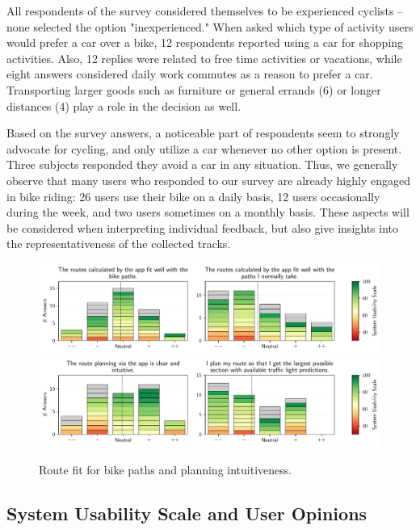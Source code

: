All respondents of the survey considered themselves to be experienced cyclists -- none selected the option "inexperienced." When asked which type of activity users would prefer a car over a bike, 12 respondents reported using a car for shopping activities. Also, 12 replies were related to free time activities or vacations, while eight answers considered daily work commutes as a reason to prefer a car. Transporting larger goods such as furniture or general errands (6) or longer distances (4) play a role in the decision as well. 

Based on the survey answers, a noticeable part of respondents seem to strongly advocate for cycling, and only utilize a car whenever no other option is present. Three subjects responded they avoid a car in any situation. Thus, we generally observe that many users who responded to our survey are already highly engaged in bike riding: 26 users use their bike on a daily basis, 12 users occasionally during the week, and two users sometimes on a monthly basis. These aspects will be considered when interpreting individual feedback, but also give insights into the representativeness of the collected tracks.

\begin{figure}[t]
\caption{Route fit for bike paths and planning intuitiveness.}\label{fig:route-fit-bike-paths}
\includegraphics[width=\linewidth]{images/app-usability-questions-route-fit-bike-paths.pdf}
\\
\includegraphics[width=\linewidth]{images/app-usability-questions-route-planning-intuitiveness.pdf}
\end{figure}

\subsection{System Usability Scale and User Opinions}

